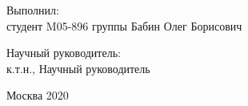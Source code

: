 %
\vspace{0pt plus1fill} %
\begin{flushleft}
Выполнил:\\
студент M05-896 группы\hspace{1cm} \underline{\hspace{3cm}} \hspace{0.5cm}
Бабин Олег Борисович
\end{flushleft}
\vspace{0pt plus1fill}
\begin{flushleft}
Научный руководитель:\\
к.т.н., \hspace{4cm}\underline{\hspace{3cm}} \hspace{0.5cm}
Научный руководитель
\end{flushleft}
%
\vspace{0pt plus4fill} %
\begin{center}%
Москва 2020
\end{center}%
\newpage
